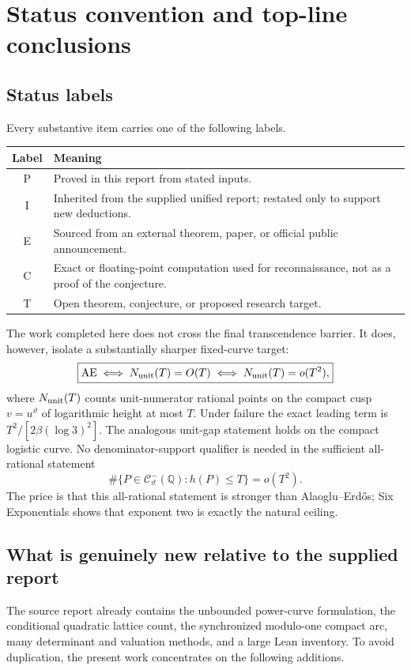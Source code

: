 \documentclass[10pt,oneside]{article}
\theoremstyle{definition}
\theoremstyle{remark}
\newcommand{\Q}{\mathbb Q}
\newcommand{\thetaq}{\vartheta}
\newcommand{\rec}{\mathcal C^-_{\thetaq}}
\newcommand{\AEconj}{\mathrm{AE}}
\newcommand{\statusP}{\textsc{P}}
\newcommand{\statusI}{\textsc{I}}
\newcommand{\statusE}{\textsc{E}}
\newcommand{\statusC}{\textsc{C}}
\newcommand{\statusT}{\textsc{T}}
\begin{document}
\tableofcontents
\clearpage
{}

\section{Status convention and top-line conclusions}

\subsection{Status labels}
Every substantive item carries one of the following labels.
\begin{center}
\begin{tabularx}{0.94\textwidth}{cX}
\toprule
Label & Meaning \\
\midrule
\statusP & Proved in this report from stated inputs. \\
\statusI & Inherited from the supplied unified report; restated only to support new deductions. \\
\statusE & Sourced from an external theorem, paper, or official public announcement. \\
\statusC & Exact or floating-point computation used for reconnaissance, not as a proof of the conjecture. \\
\statusT & Open theorem, conjecture, or proposed research target. \\
\bottomrule
\end{tabularx}
\end{center}

\begin{summarybox}
The work completed here does not cross the final transcendence barrier.  It does, however, isolate a substantially sharper fixed-curve target:
\[
\boxed{
\AEconj \iff N_{\rm unit}(T)=O(T)
     \iff N_{\rm unit}(T)=o(T^2),
}
\]
where \(N_{\rm unit}(T)\) counts unit-numerator rational points on the compact cusp \(v=u^{\thetaq}\) of logarithmic height at most \(T\).  Under failure the exact leading term is \(T^2/[2\beta(\log3)^2]\).  The analogous unit-gap statement holds on the compact logistic curve.  No denominator-support qualifier is needed in the sufficient all-rational statement
\[
 \#\{P\in\rec(\Q):h(P)\le T\}=o(T^2).
\]
The price is that this all-rational statement is stronger than Alaoglu--Erd\H{o}s; Six Exponentials shows that exponent two is exactly the natural ceiling.
\end{summarybox}

\subsection{What is genuinely new relative to the supplied report}
The source report already contains the unbounded power-curve formulation, the conditional quadratic lattice count, the synchronized modulo-one compact arc, many determinant and valuation methods, and a large Lean inventory.  To avoid duplication, the present work concentrates on the following additions.
\end{document}
